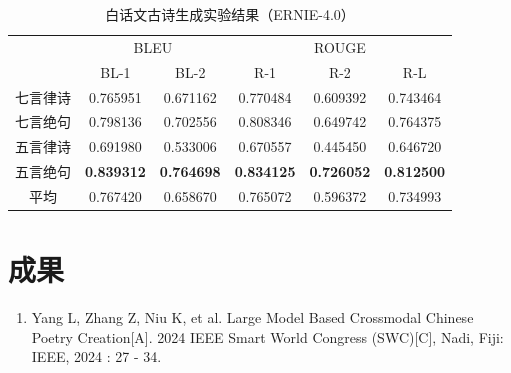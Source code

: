 \begin{table}[ht]
    \centering
    \caption{白话文古诗生成实验结果（ERNIE-4.0）}
    \label{tab:test_generation_tssbs_ernie4}
    \begin{tabular}{cccccc}
        \toprule
        & \multicolumn{2}{c}{BLEU} & \multicolumn{3}{c}{ROUGE} \\
        \cmidrule(r){2-3} \cmidrule(l){4-6}
        & BL-1& BL-2& R-1& R-2& R-L\\
        \midrule
        七言律诗&0.765951&0.671162&0.770484&0.609392&0.743464\\
        七言绝句&0.798136&0.702556&0.808346&0.649742&0.764375\\
        五言律诗&0.691980&0.533006&0.670557&0.445450&0.646720\\
        五言绝句&\bf{0.839312}&\bf{0.764698}&\bf{0.834125}&\bf{0.726052}&\bf{0.812500}\\
        \cmidrule{2-6} %
        平均&0.767420&0.658670&0.765072&0.596372&0.734993\\
        \bottomrule
    \end{tabular}
\end{table}
  


\chapter{成果}

\begin{enumerate}
    \item Yang L, Zhang Z, Niu K, et al. Large Model Based Crossmodal Chinese Poetry Creation[A]. 2024 IEEE Smart World Congress (SWC)[C], Nadi, Fiji: IEEE, 2024 : 27 - 34.
\end{enumerate}




